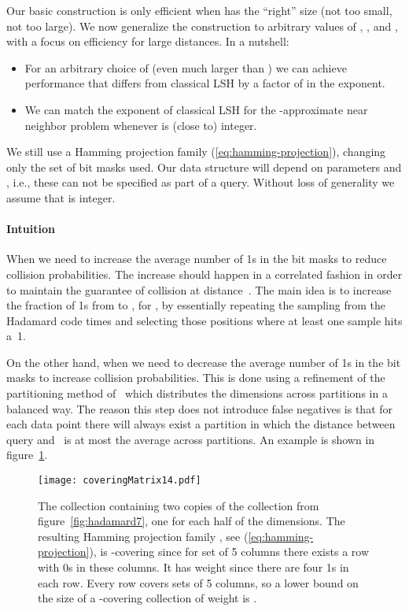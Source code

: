 \documentclass[prodmode,acmtalg]{acmsmall}
\begin{document}
Our basic construction is only efficient when  has the ``right'' size (not too small, not too large). 
We now generalize the construction to arbitrary values of , , and , with a focus on efficiency for large distances. 
In a nutshell:
\begin{itemize}
\item For an arbitrary choice of  (even much larger than ) we can achieve performance that differs from classical LSH by a factor of  in the exponent.\item We can match the exponent of classical LSH for the -approximate near neighbor problem whenever  is (close to) integer.
\end{itemize}
\noindent
We still use a Hamming projection family (\ref{eq:hamming-projection}), changing only the set  of bit masks used.
Our data structure will depend on parameters  and , i.e., these can not be specified as part of a query.
Without loss of generality we assume that  is integer.

\medskip

\paragraph{Intuition}
When  we need to increase the average number of 1s in the bit masks to reduce collision probabilities.
The increase should happen in a correlated fashion in order to maintain the guarantee of collision at distance~.
The main idea is to increase the fraction of 1s from  to , for , by essentially repeating the sampling from the Hadamard code  times and selecting those positions where at least one sample hits a~1. 

On the other hand, when  we need to decrease the average number of 1s in the bit masks to increase collision probabilities. This is done using a refinement of the partitioning method of~\cite{Arasu_VLDB06} which distributes the dimensions across partitions in a balanced way.
The reason this step does not introduce false negatives is that for each data point  there will always exist a partition in which the distance between query  and~ is at most the average across partitions. 
An example is shown in figure~\ref{fig:hadamard2x7}.

\medskip

\begin{figure}[t]
	\begin{center}
\texttt{[image: coveringMatrix14.pdf]}
\caption{The collection  containing two copies of the collection  from figure~\ref{fig:hadamard7}, one for each half of the dimensions. The resulting Hamming projection family  , see (\ref{eq:hamming-projection}), is -covering since for set of 5 columns there exists a row with 0s in these columns. It has weight  since there are four 1s in each row.
Every row covers  sets of 5 columns, so a lower bound on the size of a -covering collection of weight  is .}\label{fig:hadamard2x7}
	\end{center}
\end{figure}
\end{document}
